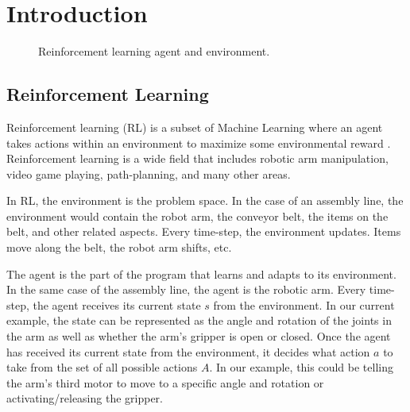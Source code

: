 \documentclass[12pt]{thesis}
\begin{document}



\body


\chapter{Introduction}
\begin{figure}
	\begin{center}
		\scalebox{0.5}{}
	\end{center}
	\caption{Reinforcement learning agent and environment.}
	\label{fig:RLagent}
\end{figure}
\section{Reinforcement Learning}
Reinforcement learning (RL) is a subset of Machine Learning where an agent takes actions within an environment to maximize some environmental reward \cite{Sutton1998}. Reinforcement learning is a wide field that includes robotic arm manipulation, video game playing, path-planning, and many other areas.

In RL, the environment is the problem space. In the case of an assembly line, the environment would contain the robot arm, the conveyor belt, the items on the belt, and other related aspects. Every time-step, the environment updates. Items move along the belt, the robot arm shifts, etc.

The agent is the part of the program that learns and adapts to its environment. In the same case of the assembly line, the agent is the robotic arm. Every time-step, the agent receives its current state $s$ from the environment. In our current example, the state can be represented as the angle and rotation of the joints in the arm as well as whether the arm’s gripper is open or closed. Once the agent has received its current state from the environment, it decides what action $a$ to take from the set of all possible actions $A$. In our example, this could be telling the arm’s third motor to move to a specific angle and rotation or activating/releasing the gripper.
\end{document}
